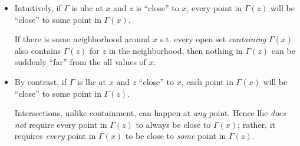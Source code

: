 \documentclass{article}
\begin{document}
\begin{itemize}[label=$\bullet$]
  \item Intuitively, if $\Gamma$ is uhc at $x$ and $z$ is ``close'' to $x$, every point in $\Gamma(z)$ will be ``close'' to some point in $\Gamma(x)$.

    If there is some neighborhood around $x$ s.t. every open set \textit{containing} $\Gamma(x)$ also contains $\Gamma(z)$ for $z$ in the neighborhood, then nothing in $\Gamma(z)$ can be suddenly ``far'' from the all values of $x$.

  \item By contrast, if $\Gamma$ is lhc at $x$ and $z$ ``close'' to $x$, each point in $\Gamma(x)$ will be ``close'' to some point in $\Gamma(z)$.

    Intersections, unlike containment, can happen at \textit{any} point. Hence lhc \textit{does not} require every point in $\Gamma(z)$ to always be close to $\Gamma(x)$; rather, it requires \textit{every} point in $\Gamma(x)$ to be close to \textit{some} point in $\Gamma(z)$.
\end{itemize}
\end{document}
